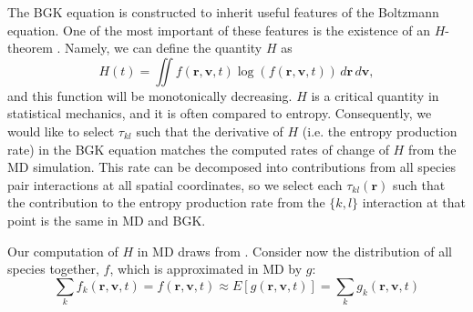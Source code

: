 \documentclass{article}
\begin{document}
The BGK equation is constructed to inherit useful features of the Boltzmann equation. One of the most important of these features is the existence of an $H$-theorem \cite{struchtrup2005macroscopic}. Namely, we can define the quantity $H$ as 
\begin{equation}
H(t)= \iint f(\mathbf{r},\mathbf{v},t)\log(f(\mathbf{r},\mathbf{v},t))\,d\mathbf{r}\,d\mathbf{v},
\end{equation}
and this function will be monotonically decreasing. $H$ is a critical quantity in statistical mechanics, and it is often compared to entropy. Consequently, we would like to select $\tau_{kl}$ such that the derivative of $H$ (i.e. the entropy production rate) in the BGK equation matches the computed rates of change of $H$ from the MD simulation. This rate can be decomposed into contributions from all species pair interactions at all spatial coordinates, so we select each $\tau_{kl}(\mathbf{r})$ such that the contribution to the entropy production rate from the $\{k,l\}$ interaction at that point is the same in MD and BGK.

Our computation of $H$ in MD draws from \cite{romero1997comments}. Consider now the distribution of all species together, $f$, which is approximated in MD by $g$:
\begin{equation}
\sum_k f_k(\mathbf{r},\mathbf{v},t)=f(\mathbf{r},\mathbf{v},t)\approx E[g(\mathbf{r},\mathbf{v},t)]=\sum_k g_k(\mathbf{r},\mathbf{v},t)
\end{equation}
\end{document}
